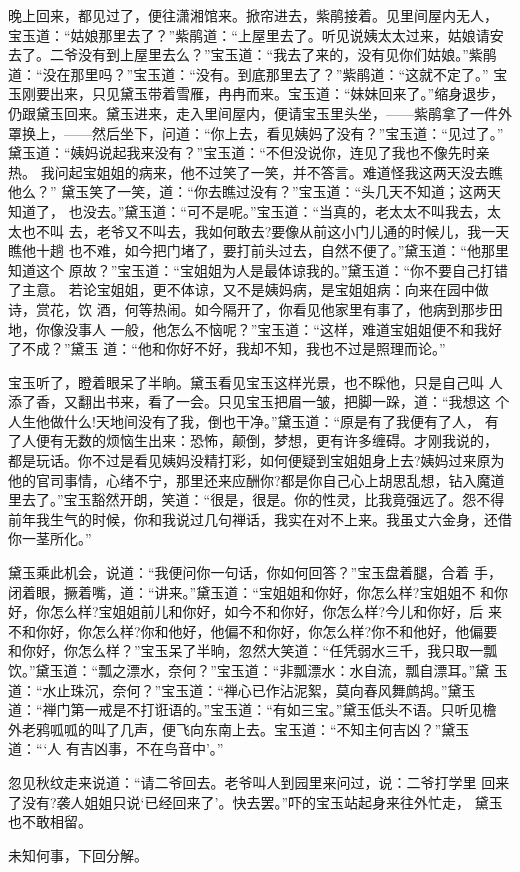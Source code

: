 晚上回来，都见过了，便往潇湘馆来。掀帘进去，紫鹃接着。见里间屋内无人，
宝玉道：“姑娘那里去了？”紫鹃道：“上屋里去了。听见说姨太太过来，姑娘请安
去了。二爷没有到上屋里去么？”宝玉道：“我去了来的，没有见你们姑娘。”紫鹃
道：“没在那里吗？”宝玉道：“没有。到底那里去了？”紫鹃道：“这就不定了。”
宝玉刚要出来，只见黛玉带着雪雁，冉冉而来。宝玉道：“妹妹回来了。”缩身退步，
仍跟黛玉回来。黛玉进来，走入里间屋内，便请宝玉里头坐，——紫鹃拿了一件外
罩换上，——然后坐下，问道：“你上去，看见姨妈了没有？”宝玉道：“见过了。”
黛玉道：“姨妈说起我来没有？”宝玉道：“不但没说你，连见了我也不像先时亲热。
我问起宝姐姐的病来，他不过笑了一笑，并不答言。难道怪我这两天没去瞧他么？”
黛玉笑了一笑，道：“你去瞧过没有？”宝玉道：“头几天不知道；这两天知道了，
也没去。”黛玉道：“可不是呢。”宝玉道：“当真的，老太太不叫我去，太太也不叫
去，老爷又不叫去，我如何敢去?要像从前这小门儿通的时候儿，我一天瞧他十趟
也不难，如今把门堵了，要打前头过去，自然不便了。”黛玉道：“他那里知道这个
原故？”宝玉道：“宝姐姐为人是最体谅我的。”黛玉道：“你不要自己打错了主意。
若论宝姐姐，更不体谅，又不是姨妈病，是宝姐姐病：向来在园中做诗，赏花，饮
酒，何等热闹。如今隔开了，你看见他家里有事了，他病到那步田地，你像没事人
一般，他怎么不恼呢？”宝玉道：“这样，难道宝姐姐便不和我好了不成？”黛玉
道：“他和你好不好，我却不知，我也不过是照理而论。”

宝玉听了，瞪着眼呆了半晌。黛玉看见宝玉这样光景，也不睬他，只是自己叫
人添了香，又翻出书来，看了一会。只见宝玉把眉一皱，把脚一跺，道：“我想这
个人生他做什么!天地间没有了我，倒也干净。”黛玉道：“原是有了我便有了人，
有了人便有无数的烦恼生出来：恐怖，颠倒，梦想，更有许多缠碍。才刚我说的，
都是玩话。你不过是看见姨妈没精打彩，如何便疑到宝姐姐身上去?姨妈过来原为
他的官司事情，心绪不宁，那里还来应酬你?都是你自己心上胡思乱想，钻入魔道
里去了。”宝玉豁然开朗，笑道：“很是，很是。你的性灵，比我竟强远了。怨不得
前年我生气的时候，你和我说过几句禅话，我实在对不上来。我虽丈六金身，还借
你一茎所化。”

黛玉乘此机会，说道：“我便问你一句话，你如何回答？”宝玉盘着腿，合着
手，闭着眼，撅着嘴，道：“讲来。”黛玉道：“宝姐姐和你好，你怎么样?宝姐姐不
和你好，你怎么样?宝姐姐前儿和你好，如今不和你好，你怎么样?今儿和你好，后
来不和你好，你怎么样?你和他好，他偏不和你好，你怎么样?你不和他好，他偏要
和你好，你怎么样？”宝玉呆了半晌，忽然大笑道：“任凭弱水三千，我只取一瓢
饮。”黛玉道：“瓢之漂水，奈何？”宝玉道：“非瓢漂水：水自流，瓢自漂耳。”黛
玉道：“水止珠沉，奈何？”宝玉道：“禅心已作沾泥絮，莫向春风舞鹧鸪。”黛玉
道：“禅门第一戒是不打诳语的。”宝玉道：“有如三宝。”黛玉低头不语。只听见檐
外老鸦呱呱的叫了几声，便飞向东南上去。宝玉道：“不知主何吉凶？”黛玉道：“‘人
有吉凶事，不在鸟音中’。”

忽见秋纹走来说道：“请二爷回去。老爷叫人到园里来问过，说：二爷打学里
回来了没有?袭人姐姐只说‘已经回来了’。快去罢。”吓的宝玉站起身来往外忙走，
黛玉也不敢相留。

未知何事，下回分解。
